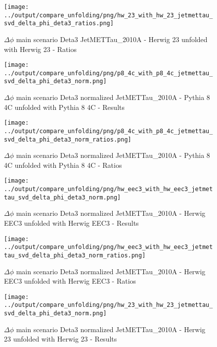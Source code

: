 \documentclass[11pt]{book}
\begin{document}
\begin{figure}[ht]
\centering
\texttt{[image: ../output/compare\_unfolding/png/hw\_23\_with\_hw\_23\_jetmettau\_svd\_delta\_phi\_deta3\_ratios.png]}
\caption{$\Delta\phi$ main scenario Deta3 JetMETTau\_2010A - Herwig 23 unfolded with Herwig 23 - Ratios}
\label{hw_23_hw_23_jetmettau_svd_delta_phi_deta3_b}
\end{figure}



\begin{figure}[ht]
\centering
\texttt{[image: ../output/compare\_unfolding/png/p8\_4c\_with\_p8\_4c\_jetmettau\_svd\_delta\_phi\_deta3\_norm.png]}
\caption{$\Delta\phi$ main scenario Deta3 normalized JetMETTau\_2010A - Pythia 8 4C unfolded with Pythia 8 4C - Results}
\label{p8_p8_jetmettau_svd_delta_phi_deta3_norm_a}
\end{figure}

\begin{figure}[ht]
\centering
\texttt{[image: ../output/compare\_unfolding/png/p8\_4c\_with\_p8\_4c\_jetmettau\_svd\_delta\_phi\_deta3\_norm\_ratios.png]}
\caption{$\Delta\phi$ main scenario Deta3 normalized JetMETTau\_2010A - Pythia 8 4C unfolded with Pythia 8 4C - Ratios}
\label{p8_p8_jetmettau_svd_delta_phi_deta3_norm_b}
\end{figure}

\begin{figure}[ht]
\centering
\texttt{[image: ../output/compare\_unfolding/png/hw\_eec3\_with\_hw\_eec3\_jetmettau\_svd\_delta\_phi\_deta3\_norm.png]}
\caption{$\Delta\phi$ main scenario Deta3 normalized JetMETTau\_2010A - Herwig EEC3 unfolded with Herwig EEC3 - Results}
\label{hw_eec3_hw_eec3_jetmettau_svd_delta_phi_deta3_norm_a}
\end{figure}

\begin{figure}[ht]
\centering
\texttt{[image: ../output/compare\_unfolding/png/hw\_eec3\_with\_hw\_eec3\_jetmettau\_svd\_delta\_phi\_deta3\_norm\_ratios.png]}
\caption{$\Delta\phi$ main scenario Deta3 normalized JetMETTau\_2010A - Herwig EEC3 unfolded with Herwig EEC3 - Ratios}
\label{hw_eec3_hw_eec3_jetmettau_svd_delta_phi_deta3_norm_b}
\end{figure}

\begin{figure}[ht]
\centering
\texttt{[image: ../output/compare\_unfolding/png/hw\_23\_with\_hw\_23\_jetmettau\_svd\_delta\_phi\_deta3\_norm.png]}
\caption{$\Delta\phi$ main scenario Deta3 normalized JetMETTau\_2010A - Herwig 23 unfolded with Herwig 23 - Results}
\label{hw_23_hw_23_jetmettau_svd_delta_phi_deta3_norm_a}
\end{figure}
\end{document}
